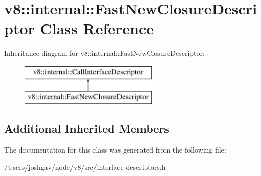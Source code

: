 \hypertarget{classv8_1_1internal_1_1_fast_new_closure_descriptor}{}\section{v8\+:\+:internal\+:\+:Fast\+New\+Closure\+Descriptor Class Reference}
\label{classv8_1_1internal_1_1_fast_new_closure_descriptor}
Inheritance diagram for v8\+:\+:internal\+:\+:Fast\+New\+Closure\+Descriptor\+:\begin{figure}[H]
\begin{center}
\leavevmode
\includegraphics[height=2.000000cm]{classv8_1_1internal_1_1_fast_new_closure_descriptor}
\end{center}
\end{figure}
\subsection*{Additional Inherited Members}


The documentation for this class was generated from the following file\+:\begin{DoxyCompactItemize}
\item 
/\+Users/joshgav/node/v8/src/interface-\/descriptors.\+h\end{DoxyCompactItemize}
